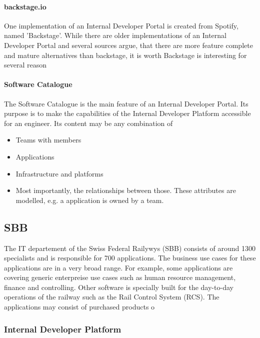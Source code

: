 \documentclass[a4paper,12pt]{article}
\begin{document}
    \paragraph{backstage.io}
    One implementation of an Internal Developer Portal is created from Spotify, named 'Backstage'\cite{backstageio}.
    While there are older implementations of an Internal Developer Portal and several sources argue, that there are more
    feature complete and mature alternatives than backstage, it is worth Backstage is interesting for several reason
    \paragraph{Software Catalogue}
    The Software Catalogue is the main feature of an Internal Developer Portal.
    Its purpose is to make the capabilities of the Internal Developer Platform accessible for an engineer.
    Its content may be any combination of
    \begin{itemize}
        \item Teams with members
        \item Applications
        \item Infrastructure and platforms
        \item Most importantly, the relationships between those. These attributes are modelled, e.g. a application is owned by a team.
    \end{itemize}



    \subsection{SBB}
    The IT departement of the Swiss Federal Railywys (SBB) consists of around 1300 specialists and is responsible for
    700 applications\cite{sbbitkennzahlen}.
    The business use cases for these applications are in a very broad range.
    For example, some applications are covering generic enterpreise use cases such as human resource management, finance and controlling.
    Other software is specially built for the day-to-day operations of the railway such as the Rail Control System (RCS)\cite{sbbrcs}.
    The applications may consist of purchased products o %
    \subsubsection{Internal Developer Platform}
\end{document}
